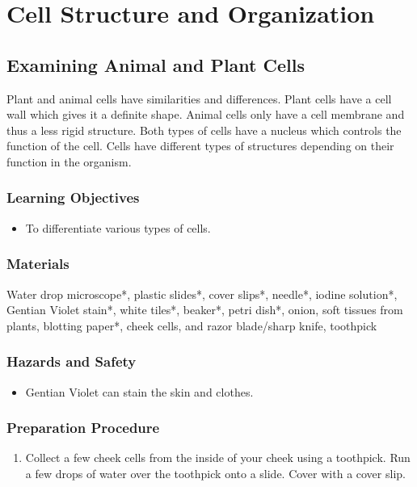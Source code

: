 \section{Cell Structure and Organization}
\subsection{Examining Animal and Plant Cells}
Plant and animal cells have similarities and differences. Plant cells have a cell wall which gives it a definite shape. Animal cells only have a cell membrane and thus a less rigid structure. Both types of cells have a nucleus which controls the function of the cell. Cells have different types of structures depending on their function in the organism.

\subsubsection*{Learning Objectives}
\begin{itemize}
\item{To differentiate various types of cells.}
\end{itemize}

\subsubsection*{Materials}
Water drop microscope*, plastic slides*, cover slips*, needle*, iodine solution*, Gentian Violet stain*, white tiles*, beaker*, petri dish*, onion, soft tissues from plants, blotting paper*, cheek cells, and razor blade/sharp knife, toothpick

\subsubsection*{Hazards and Safety}
\begin{itemize}
\item{Gentian Violet can stain the skin and clothes.}
\end{itemize}

\subsubsection*{Preparation Procedure}
\begin{enumerate}
\item{Collect a few cheek cells from the inside of your cheek using a toothpick. Run a few drops of water over the toothpick onto a slide. Cover with a cover slip.}
\end{enumerate}

